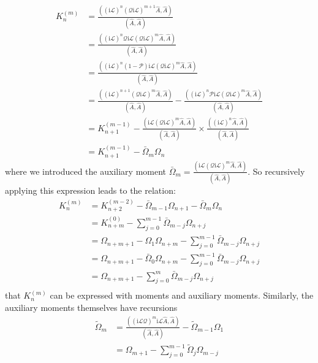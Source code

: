 \begin{align}
K_n^{(m)} &= \frac{\left((\mathrm{i} \mathcal{L})^n(\mathcal{Q} \mathrm{i} \mathcal{L})^{m+1} \hat{A}, \hat{A}\right)}{(\hat{A}, \hat{A})} \\
&= \frac{\left((\mathrm{i} \mathcal{L})^n \mathcal{Q} \mathrm{i} \mathcal{L} (\mathcal{Q} \mathrm{i} \mathcal{L})^{m}\hat{A}, \hat{A}\right)}{(\hat{A}, \hat{A})} \\
&= \frac{\left((\mathrm{i} \mathcal{L})^n \left(1-\mathcal{P}\right) \mathrm{i} \mathcal{L} (\mathcal{Q} \mathrm{i} \mathcal{L})^{m} \hat{A}, \hat{A}\right)}{(\hat{A}, \hat{A})} \\
&= \frac{\left((\mathrm{i} \mathcal{L})^{n+1} (\mathcal{Q} \mathrm{i} \mathcal{L})^{m} \hat{A}, \hat{A}\right)}{(\hat{A}, \hat{A})} - \frac{\left((\mathrm{i} \mathcal{L})^n \mathcal{P} \mathrm{i} \mathcal{L} (\mathcal{Q} \mathrm{i} \mathcal{L})^{m} \hat{A}, \hat{A}\right)}{(\hat{A}, \hat{A})} \\
&= K_{n+1}^{(m-1)} - \frac{\left(\mathrm{i} \mathcal{L}(\mathcal{Q} \mathrm{i} \mathcal{L})^m \hat{A}, \hat{A}\right)}{(\hat{A}, \hat{A})} \times \frac{\left((\mathrm{i} \mathcal{L})^n \hat{A}, \hat{A}\right)}{(\hat{A}, \hat{A})} \\
&= K_{n+1}^{(m-1)} - \bar{\Omega}_m \Omega_n 
\end{align}
where we introduced the auxiliary moment $\bar{\Omega}_m=\frac{\left(\mathrm{i} \mathcal{L}(\mathcal{Q} \mathrm{i} \mathcal{L})^m \hat{A}, \hat{A}\right)}{(\hat{A}, \hat{A})}$.
So recursively applying this expression leads to the relation: 
\begin{align}
K_n^{(m)} &= K_{n+2}^{(m-2)} - \bar{\Omega}_{m-1} \Omega_{n+1} - \bar{\Omega}_m \Omega_{n} \\
&= K_{n+m}^{(0)} - \sum_{j=0}^{m-1} \bar{\Omega}_{m-j} \Omega_{n+j} \\
&= \Omega_{n+m+1} - \Omega_{1} \Omega_{n+m} - \sum_{j=0}^{m-1} \bar{\Omega}_{m-j} \Omega_{n+j} \\
&= \Omega_{n+m+1} - \bar{\Omega}_{0} \Omega_{n+m} - \sum_{j=0}^{m-1} \bar{\Omega}_{m-j} \Omega_{n+j} \\
&= \Omega_{n+m+1} - \sum_{j=0}^{m} \bar{\Omega}_{m-j} \Omega_{n+j} \\
\end{align}
that $K_{n}^{(m)}$ can be expressed with moments and auxiliary moments. Similarly, the auxiliary moments themselves have recursions
\begin{equation}    
\begin{aligned}
    \tilde{\Omega}_m &= \frac{\left((\mathrm{i} \mathcal{L} \mathcal{Q})^{m} \mathrm{i} \mathcal{L} \hat{A}, \hat{A}\right)}{(\hat{A}, \hat{A})} - \tilde{\Omega}_{m-1} \Omega_1\\
    &= \Omega_{m+1} - \sum_{j=0}^{m-1} \tilde{\Omega}_j \Omega_{m-j} \\ 
\end{aligned}
\end{equation}
